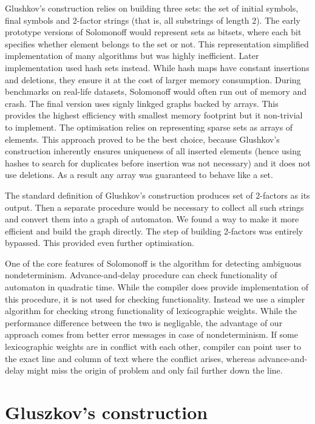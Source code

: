 Glushkov's construction relies on building three sets: the set of initial symbols, final symbols and 2-factor\cite{GLUSHKOV} strings (that is, all substrings of length 2). The early prototype versions of Solomonoff would represent sets as bitsets, where each bit specifies whether element belongs to the set or not. This representation simplified implementation of many algorithms but was highly inefficient. Later implementation used hash sets instead. While hash maps have constant insertions and deletions, they ensure it at the cost of larger memory consumption. During benchmarks on real-life datasets, Solomonoff would often run out of memory and crash.  The final version uses signly linkged graphs backed by arrays. This provides the highest efficiency with smallest memory footprint but it non-trivial to implement. The optimisation relies on representing sparse sets as arrays of elements. This approach proved to be the best choice, because Glushkov's construction inherently ensures uniqueness of all inserted elements (hence using hashes to search for duplicates before insertion was not necessary)  and it does not use deletions. As a result any array was guaranteed to behave like a set.

The standard definition of Glushkov's construction produces set of 2-factors as its output. Then a separate procedure would be necessary to collect all such strings and convert them into a graph of automaton. We found a way to make it more efficient and build the graph directly. The step of building 2-factors was entirely bypassed. This provided even further optimisation.

One of the core features of Solomonoff is the algorithm for detecting ambiguous nondeterminism. Advance-and-delay procedure can check functionality of automaton in quadratic time. While the compiler does provide implementation of this procedure, it is not used for checking functionality. Instead we use a simpler algorithm for checking strong functionality of lexicographic weights\cite{MendozaDrosik2020MultitapeAA}. While the performance difference between the two is negligable, the advantage of our approach comes from  better error messages in case of nondeterminism. If some lexicographic weights are in conflict with each other, compiler can point user to the exact line and column of text where the conflict arises, whereas advance-and-delay might miss the origin of problem and only fail further down the line.

\section{Gluszkov's construction}


